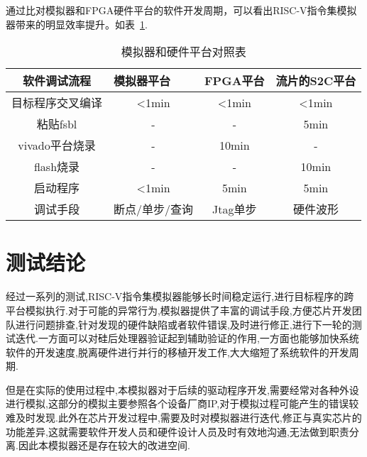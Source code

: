 通过比对模拟器和FPGA硬件平台的软件开发周期，可以看出RISC-V指令集模拟器带来的明显效率提升。如表~\ref{tab:cmp}.
\begin{table}[h]
  \centering
  \caption{模拟器和硬件平台对照表}
  \label{tab:cmp}
  \renewcommand\arraystretch{1.1}
  \begin{tabular}{cccc}
    \toprule
    \multicolumn{1}{c}{软件调试流程} & \multicolumn{1}{l}{模拟器平台} & \multicolumn{1}{l}{FPGA平台} &\multicolumn{1}{l}{流片的S2C平台}\\
    \midrule
目标程序交叉编译	& \multicolumn{1}{m{3cm}}{<1min} & \multicolumn{1}{m{3cm}}{<1min} & \multicolumn{1}{m{3cm}}{<1min}\\
\hline
粘贴fsbl	& \multicolumn{1}{m{3cm}}{-} & \multicolumn{1}{m{3cm}}{-} & \multicolumn{1}{m{3cm}}{5min}\\
\hline
vivado平台烧录	& \multicolumn{1}{m{3cm}}{-} & \multicolumn{1}{m{3cm}}{10min} & \multicolumn{1}{m{3cm}}{-}\\
\hline
flash烧录	& \multicolumn{1}{m{3cm}}{-} & \multicolumn{1}{m{3cm}}{-} & \multicolumn{1}{m{3cm}}{10min}\\
\hline
启动程序	& \multicolumn{1}{m{3cm}}{<1min} & \multicolumn{1}{m{3cm}}{5min} & \multicolumn{1}{m{3cm}}{5min}\\
\hline
调试手段	& \multicolumn{1}{m{3cm}}{断点/单步/查询} & \multicolumn{1}{m{3cm}}{Jtag单步} & \multicolumn{1}{m{3cm}}{硬件波形}\\
    \bottomrule
  \end{tabular}
\end{table}


\section{测试结论}
经过一系列的测试,RISC-V指令集模拟器能够长时间稳定运行,进行目标程序的跨平台模拟执行.对于可能的异常行为,模拟器提供了丰富的调试手段,方便芯片开发团队进行问题排查,针对发现的硬件缺陷或者软件错误,及时进行修正,进行下一轮的测试迭代.一方面可以对硅后处理器验证起到辅助验证的作用,一方面也能够加快系统软件的开发速度,脱离硬件进行并行的移植开发工作,大大缩短了系统软件的开发周期.


但是在实际的使用过程中,本模拟器对于后续的驱动程序开发,需要经常对各种外设进行模拟,这部分的模拟主要参照各个设备厂商IP,对于模拟过程可能产生的错误较难及时发现.此外在芯片开发过程中,需要及时对模拟器进行迭代,修正与真实芯片的功能差异,这就需要软件开发人员和硬件设计人员及时有效地沟通,无法做到职责分离.因此本模拟器还是存在较大的改进空间.